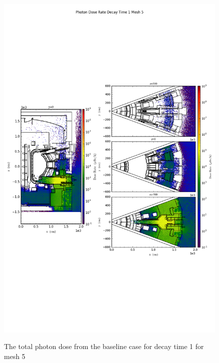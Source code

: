 \begin{figure}[ht!]
\centering
\includegraphics[trim={0cm 9cm 0cm 10cm},clip,scale=0.75]{../plots/final_model_nob4c/Photon_Dose_Rate_Decay_Time_1_Mesh_5.png}
\label{fig:photons_dc1_no4bc_m5_flux}
\caption{The total photon dose from the baseline case for decay time 1 for mesh 5}
\end{figure}
